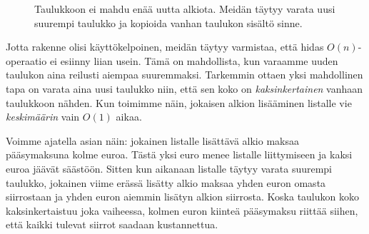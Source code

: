 \begin{figure}
\center
{}
\caption{Taulukkoon ei mahdu enää uutta alkiota. Meidän täytyy varata uusi suurempi taulukko
ja kopioida vanhan taulukon sisältö sinne.}
\label{fig:lisuus}
\end{figure}

Jotta rakenne olisi käyttökelpoinen, meidän täytyy varmistaa,
että hidas $O(n)$-operaatio ei esiinny liian usein.
Tämä on mahdollista, kun varaamme uuden taulukon aina reilusti aiempaa suuremmaksi.
Tarkemmin ottaen yksi mahdollinen tapa on varata aina uusi taulukko niin,
että sen koko on \emph{kaksinkertainen} vanhaan taulukkoon nähden.
Kun toimimme näin, jokaisen alkion lisääminen listalle vie
\emph{keskimäärin} vain $O(1)$ aikaa.

Voimme ajatella asian näin: jokainen listalle lisättävä alkio
maksaa pääsy\-maksuna kolme euroa.
Tästä yksi euro menee listalle liittymiseen ja kaksi euroa jäävät säästöön.
Sitten kun aikanaan listalle täytyy varata suurempi taulukko,
jokainen viime erässä lisätty alkio maksaa yhden euron omasta siirrostaan
ja yhden euron aiemmin lisätyn alkion siirrosta.
Koska taulukon koko kaksinkertaistuu joka vaiheessa,
kolmen euron kiinteä pääsymaksu riittää siihen, että kaikki tulevat
siirrot saadaan kustannettua.

